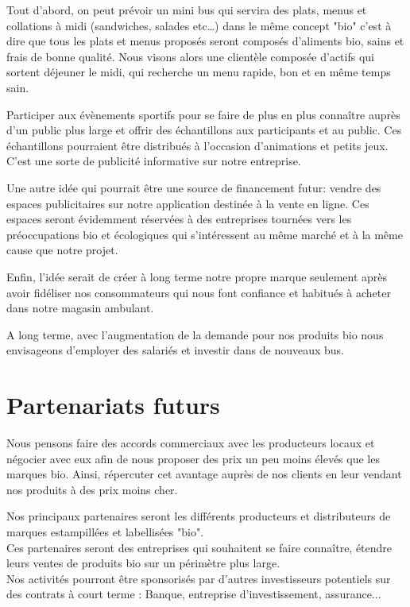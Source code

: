 \documentclass[12pt,a4paper]{report}
\begin{document}
	Tout d'abord, on peut prévoir un mini bus qui servira des plats, menus et collations à midi (sandwiches, salades etc…) dans le même concept "bio" c'est à dire que tous les plats et menus proposés seront composés d'aliments bio, sains et frais de bonne qualité. Nous visons alors une clientèle composée d'actifs qui sortent déjeuner le midi, qui recherche un menu rapide, bon et en même temps sain.
	
	Participer aux évènements sportifs pour se faire de plus en plus connaître auprès d'un public plus large et offrir des échantillons aux participants et au public. Ces échantillons pourraient être distribués à l'occasion d'animations et petits jeux. C’est une sorte de publicité informative sur notre entreprise.
	
	Une autre idée qui pourrait être une source de financement futur: vendre des espaces publicitaires sur notre application destinée à la vente en ligne. Ces espaces seront évidemment réservées à des entreprises tournées vers les préoccupations bio et écologiques qui s’intéressent au même marché et à la même cause que notre projet.
	
	Enfin, l'idée serait de créer à long terme notre propre marque seulement après avoir fidéliser nos consommateurs qui nous font confiance et habitués à acheter dans notre magasin ambulant.
	
	A long terme, avec l'augmentation de la demande pour nos produits bio nous envisageons d'employer des salariés et investir dans de nouveaux bus. 
	
	\section{Partenariats futurs}
	
	Nous pensons faire des accords commerciaux avec les producteurs locaux et négocier avec eux afin de nous proposer des prix un peu moins élevés que les marques bio. Ainsi, répercuter cet avantage auprès de nos clients en leur vendant nos produits à des prix moins cher.
	
	Nos principaux partenaires seront les différents producteurs et distributeurs de marques estampillées et labellisées "bio".\\
	
	Ces partenaires seront des entreprises qui souhaitent se faire connaître, étendre leurs ventes de produits bio sur un périmètre plus large.\\
	
	Nos activités pourront être sponsorisés par d'autres investisseurs potentiels sur des contrats à court terme : Banque, entreprise d’investissement, assurance...\\
	
\end{document}

